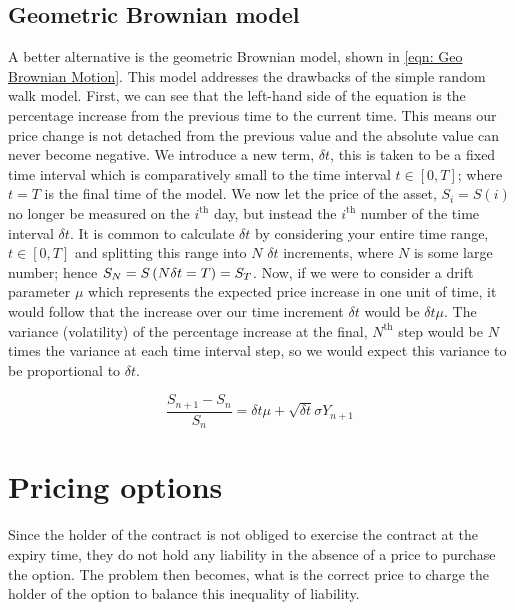 \subsection{Geometric Brownian model}

A better alternative is the geometric Brownian model, shown in \autoref{eqn: Geo Brownian Motion}. This model addresses the drawbacks of the simple random walk model. First, we can see that the left-hand side of the equation is the percentage increase from the previous time to the current time. This means our price change is not detached from the previous value and the absolute value can never become negative.
\nline{}
We introduce a new term, \(\delta t\), this is taken to be a fixed time interval which is comparatively small to the time interval \(t \in [0,T]\); where \(t = T\) is the final time of the model. We now let the price of the asset, \(S_i = S(i)\) no longer be measured on the \(i^{\text{th}}\) day, but instead the \(i^{\text{th}}\) number of the time interval \(\delta t\). It is common to calculate \(\delta t\) by considering your entire time range, \(t\in[0,T]\) and splitting this range into \(N\) \(\delta t\) increments, where \(N\) is some large number; hence \(S_{N} = S\left(N\delta t = T\right) = S_T\). Now, if we were to consider a drift parameter \(\mu \) which represents the expected price increase in one unit of time, it would follow that the increase over our time increment \(\delta t\) would be \(\delta t \mu \). The variance (volatility) of the percentage increase at the final, \(N^{\text{th}}\) step would be \(N\) times the variance at each time interval step, so we would expect this variance to be proportional to \(\delta t\).

\begin{equation}\label{eqn: Geo Brownian Motion}
    \frac{S_{n+1} - S_n}{S_n} = \delta t\mu + \sqrt{\delta t}\sigma Y_{n+1}
\end{equation}

\section{Pricing options}

Since the holder of the contract is not obliged to exercise the contract at the expiry time, they do not hold any liability in the absence of a price to purchase the option. The problem then becomes, what is the correct price to charge the holder of the option to balance this inequality of liability.



